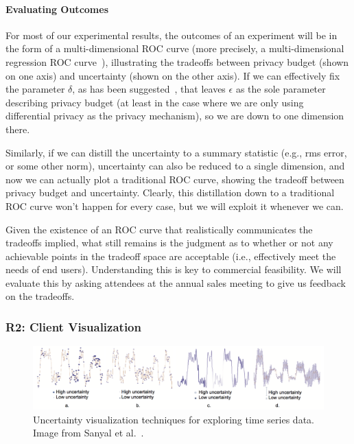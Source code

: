 \paragraph{Evaluating Outcomes}
For most of our experimental results, the outcomes of an experiment
will be in the form of a multi-dimensional ROC curve
(more precisely, a multi-dimensional
regression ROC curve~\cite{Fawcett06,HO13,Mossman99}), illustrating
the tradeoffs between privacy budget (shown on one axis) and uncertainty
(shown on the other axis). If we can effectively fix the parameter $\delta$,
as has been suggested~\cite{dr14}, that leaves $\epsilon$ as the
sole parameter describing privacy budget (at least in the case where
we are only using differential privacy as the privacy mechanism), so we
are down to one dimension there.

Similarly, if we can distill the uncertainty to a summary statistic
(e.g., rms error, or some other norm), uncertainty can also be reduced
to a single dimension, and now we can actually plot a traditional ROC
curve, showing the tradeoff between privacy budget and uncertainty.
Clearly, this distillation down to a traditional ROC curve won't happen
for every case, but we will exploit it whenever we can.

Given the existence of an ROC curve that realistically communicates the
tradeoffs implied, what still remains is the judgment as to whether or
not any achievable points in the tradeoff space are acceptable (i.e.,
effectively meet the needs of end users).  Understanding
this is key to commercial
feasibility. We will evaluate this by
asking attendees at the annual sales meeting to give us feedback on 
the tradeoffs.

\subsubsection{R2: Client Visualization}

\begin{figure}[t]
	\centering
	\includegraphics[width=1.0\columnwidth]{uncertainty}
	\caption{Uncertainty visualization techniques for exploring time series data. Image from Sanyal et al.~\cite{sanyal2009user}.}
	\label{fig:uncertainty}
\end{figure}

